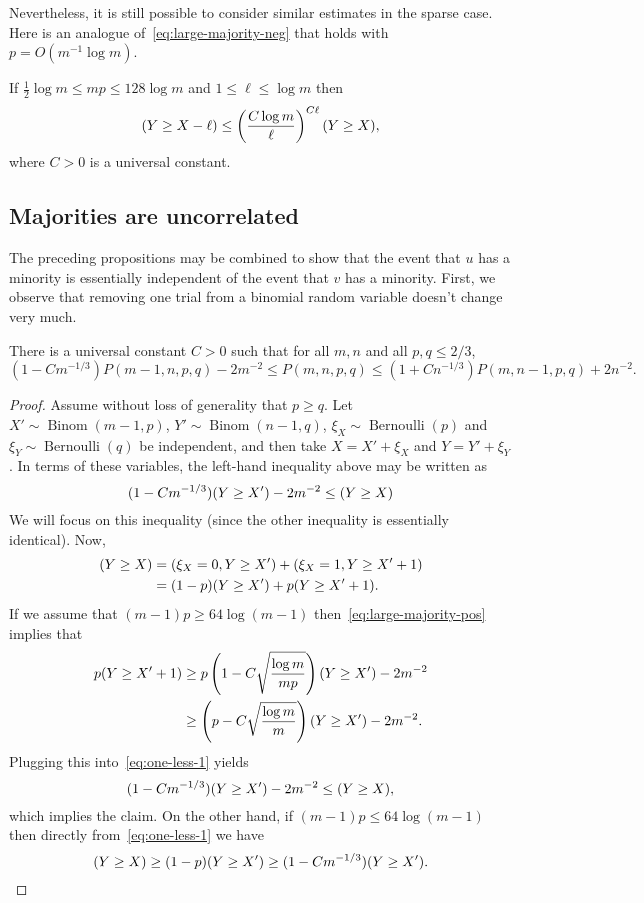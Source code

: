 \documentclass[EJP,final]{ejpecp}
\newcommand{\1}[1]{\mathbbm{1}_{\{#1\}}}
\let\Pr\relax
\DeclareMathOperator{\Pr}{Pr}
\DeclareMathOperator{\Ber}{Bernoulli}
\DeclareMathOperator{\Binom}{Binom}
\begin{document}
Nevertheless, it is still possible to consider similar estimates
in the sparse case. Here is an analogue of~\eqref{eq:large-majority-neg}
that holds with $p = O(m^{-1} \log m)$.

\begin{proposition}\label{prop:large-majority-sparse}
 If $\frac 12 \log m \le mp \le 128 \log m$ and $1 \le \ell \le \log m$
 then
 \[
  \Pr(Y \ge X - \ell) \le \left(\frac{C \log m}{\ell}\right)^{C\ell}
  \Pr(Y \ge X),
 \]
 where $C > 0$ is a universal constant.
\end{proposition}

\subsection{Majorities are uncorrelated}

The preceding propositions may be combined to 
show that the event that $u$ has a minority is essentially independent
of the event that $v$ has a minority.
First, we observe that removing one trial from a binomial random
variable doesn't change very much.

\begin{lemma}\label{lem:one-less}
  There is a universal constant $C > 0$ such that for all
  $m, n$ and all $p, q \le 2/3$,
  \[
  (1 - C m^{-1/3}) P(m-1, n, p, q) - 2m^{-2}
    \le P(m, n, p, q)
    \le (1 + C n^{-1/3}) P(m, n-1, p, q) + 2n^{-2}.
  \]
\end{lemma}

\begin{proof}
  Assume without loss of generality that $p \ge q$.
  Let $X' \sim \Binom(m-1, p)$, $Y' \sim \Binom(n-1, q)$,
  $\xi_X \sim \Ber(p)$ and $\xi_Y \sim \Ber(q)$ be independent,
  and then take $X = X' + \xi_X$ and $Y = Y' + \xi_Y$. In terms
  of these variables, the left-hand inequality above may be written 
  as
  \[
  (1- C m^{-1/3}) \Pr(Y \ge X') - 2m^{-2} \le \Pr(Y \ge X)
  \]
  We will focus on this inequality (since the other inequality
  is essentially identical). Now,
 \begin{align}
  \Pr(Y \ge X) &= \Pr(\xi_X = 0, Y \ge X') + \Pr(\xi_X = 1, Y \ge X' + 1) \notag \\
  &= (1-p) \Pr(Y \ge X') + p \Pr(Y \ge X' + 1).
  \label{eq:one-less-1}
 \end{align}
 If we assume that $(m-1)p \ge 64 \log (m-1)$
 then~\eqref{eq:large-majority-pos} implies that
 \begin{align*}
  p \Pr(Y \ge X' + 1)
  &\ge p\left(1 - C \sqrt\frac{\log m}{mp}\right) \Pr(Y \ge X') - 2m^{-2}\\
  &\ge \left(p - C \sqrt\frac{\log m}{m}\right) \Pr(Y \ge X') - 2m^{-2}.
 \end{align*}
 Plugging this into~\eqref{eq:one-less-1} yields
 \[
 (1 - C m^{-1/3}) \Pr(Y \ge X') - 2m^{-2} \le \Pr(Y \ge X),
 \]
 which implies the claim. On the other hand, if $(m-1)p \le 64 \log (m-1)$ then
 directly from~\eqref{eq:one-less-1} we have
 \[
  \Pr(Y \ge X) \ge (1-p) \Pr(Y \ge X') \ge (1 - C m^{-1/3}) \Pr(Y \ge X').
  \qedhere
 \]
\end{proof}
\end{document}
